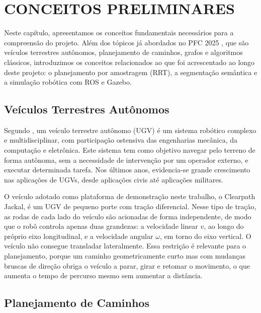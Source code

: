 \documentclass[
    12pt,
    openright,
    oneside,
    a4paper,
    english,
    brazil
]{abntex2}
\begin{document}
\chapter{CONCEITOS PRELIMINARES}

Neste capítulo, apresentamos os conceitos fundamentais necessários para a compreensão do projeto. Além dos tópicos já abordados no PFC 2025 \cite{camelo2025}, que são veículos terrestres autônomos, planejamento de caminhos, grafos e algoritmos clássicos, introduzimos os conceitos relacionados ao que foi acrescentado ao longo deste projeto: o planejamento por amostragem (RRT), a segmentação semântica e a simulação robótica com ROS e Gazebo.

\section{Veículos Terrestres Autônomos}

Segundo \cite{finn2010}, um veículo terrestre autônomo (UGV) é um sistema robótico complexo e multidisciplinar, com participação ostensiva das engenharias mecânica, da computação e eletrônica. Este sistema tem como objetivo navegar pelo terreno de forma autônoma, sem a necessidade de intervenção por um operador externo, e executar determinada tarefa. Nos últimos anos, evidencia-se grande crescimento nas aplicações de UGVs, desde aplicações civis até aplicações militares.

O veículo adotado como plataforma de demonstração neste trabalho, o Clearpath Jackal, é um UGV de pequeno porte com tração diferencial. Nesse tipo de tração, as rodas de cada lado do veículo são acionadas de forma independente, de modo que o robô controla apenas duas grandezas: a velocidade linear $v$, ao longo do próprio eixo longitudinal, e a velocidade angular $\omega$, em torno do eixo vertical. O veículo não consegue transladar lateralmente. Essa restrição é relevante para o planejamento, porque um caminho geometricamente curto mas com mudanças bruscas de direção obriga o veículo a parar, girar e retomar o movimento, o que aumenta o tempo de percurso mesmo sem aumentar a distância.

\section{Planejamento de Caminhos}
\end{document}
